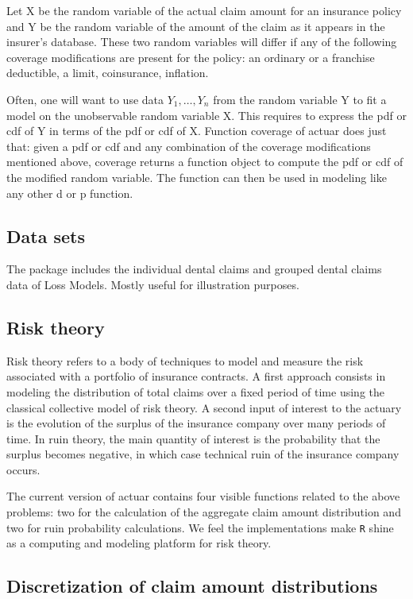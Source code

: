 \documentclass[12pt]{article}
\begin{document}
Let X be the random variable of the actual claim amount for an insurance policy and Y be the random variable of the amount of the claim as it appears in the insurer's database. These two random variables will differ if any of the following coverage modifications are present for the policy: an ordinary or a franchise deductible, a limit, coinsurance, inflation. 

Often, one will want to use data $Y_1, \ldots, Y_n$ from the random variable Y to fit a model on the unobservable random variable X. This requires to express the pdf or cdf of Y in terms of the pdf or cdf of X. Function coverage of actuar does just that: given a pdf or cdf and any combination of the coverage modifications mentioned above, coverage returns a function object to compute the pdf or cdf of the modified random variable. The function can then be used in modeling like any other d or p function.

\subsection{Data sets}

The package includes the individual dental claims and grouped dental claims data of Loss Models. Mostly useful for illustration purposes. 

\subsection{Risk theory}

Risk theory refers to a body of techniques to model and measure the risk associated with a portfolio of insurance contracts. A first approach consists in modeling the distribution of total claims over a fixed period of time using the classical collective model of risk theory. A second input of interest to the actuary is the evolution of the surplus of the insurance company over many periods of time. In ruin theory, the main quantity of interest is the probability that the surplus becomes negative, in which case technical ruin of the insurance company occurs.

The current version of actuar contains four visible functions related to the above problems: two for the calculation of the aggregate claim amount distribution and two for ruin probability calculations. We feel the implementations make \texttt{R} shine as a computing and modeling platform for risk theory.

\subsection{Discretization of claim amount distributions}
\end{document}

